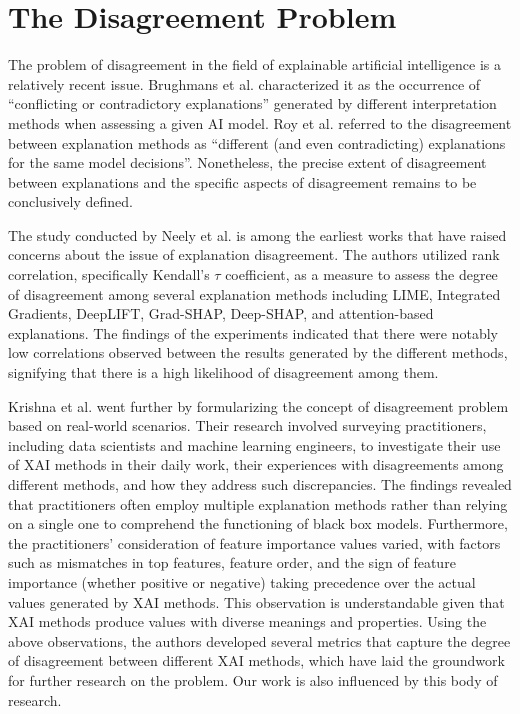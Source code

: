 \section{The Disagreement Problem}
\label{sec:disagreementProblem}
The problem of disagreement in the field of explainable artificial intelligence is a relatively recent issue. Brughmans et al. \cite{disagreementCounterfactual} characterized it as the occurrence of ``conflicting or contradictory explanations'' generated by different interpretation methods when assessing a given AI model. Roy et al. \cite{whyDontXAITechniquesAgree} referred to the disagreement between explanation methods as ``different (and even contradicting) explanations for the same model decisions''. Nonetheless, the precise extent of disagreement between explanations and the specific aspects of disagreement remains to be conclusively defined.

The study conducted by Neely et al. \cite{proneToDisagreement} is among the earliest works that have raised concerns about the issue of explanation disagreement. The authors utilized rank correlation, specifically Kendall's $\tau$ coefficient, as a measure to assess the degree of disagreement among several explanation methods including LIME, Integrated Gradients, DeepLIFT, Grad-SHAP, Deep-SHAP, and attention-based explanations. The findings of the experiments indicated that there were notably low correlations observed between the results generated by the different methods, signifying that there is a high likelihood of disagreement among them.

Krishna et al. \cite{krishna_disagreement_problem} went further by formularizing the concept of disagreement problem based on real-world scenarios. Their research involved surveying practitioners, including data scientists and machine learning engineers, to investigate their use of XAI methods in their daily work, their experiences with disagreements among different methods, and how they address such discrepancies. The findings revealed that practitioners often employ multiple explanation methods rather than relying on a single one to comprehend the functioning of black box models. Furthermore, the practitioners' consideration of feature importance values varied, with factors such as mismatches in top features, feature order, and the sign of feature importance (whether positive or negative) taking precedence over the actual values generated by XAI methods. This observation is understandable given that XAI methods produce values with diverse meanings and properties. Using the above observations, the authors developed several metrics that capture the degree of disagreement between different XAI methods, which have laid the groundwork for further research on the problem. Our work is also influenced by this body of research.

